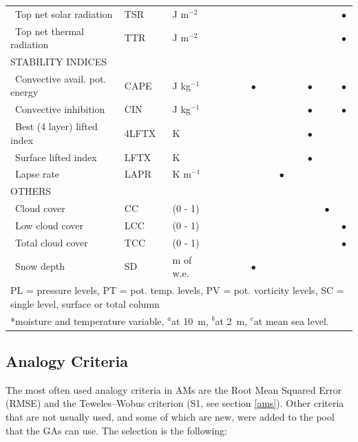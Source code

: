 \documentclass[draft]{agujournal2019}
\begin{document}
\begin{table}[!htbp]
{\begin{tabular}{lll|cccc|cccc|cc}
		\ Top net solar radiation & TSR & J m$^{-2}$ &  &  &  &  &  &  &  & & & $\bullet$ \\
		\ Top net thermal radiation & TTR & J m$^{-2}$ &  &  &  &  &  &  &  & & & $\bullet$ \\
		\hline
		\multicolumn{3}{l|}{\uppercase{Stability indices}} & & & & & & & & & & \\
		\ Convective avail. pot. energy & CAPE & J kg$^{-1}$ &  &  &  & $\bullet$ &  &  &  & $\bullet$ & & $\bullet$ \\
		\ Convective inhibition & CIN & J kg$^{-1}$ &  &  &  &  &  &  &  & $\bullet$ & & $\bullet$ \\
		\ Best (4 layer) lifted index & 4LFTX & K &  &  &  &  &  &  &  & $\bullet$ & & \\
		\ Surface lifted index & LFTX & K &  &  &  &  &  &  &  & $\bullet$ & & \\
		\ Lapse rate & LAPR & K m$^{-1}$ &  &  &  &  &  & $\bullet$ &  &  & & \\
		\hline
		\multicolumn{3}{l|}{\uppercase{Others}} & & & & & & & & & & \\
		\ Cloud cover & CC & (0 - 1) &  &  &  &  &  &  &  &  & $\bullet$ & \\
		\ Low cloud cover & LCC & (0 - 1) &  &  &  &  &  &  &  &  & & $\bullet$ \\
		\ Total cloud cover & TCC & (0 - 1) &  &  &  &  &  &  &  &  &  & $\bullet$ \\
		\ Snow depth & SD & m of w.e. &  &  &  & $\bullet$ &  &  &  &  & & \\
		\hline
		\multicolumn{13}{l}{PL = pressure levels, PT = pot. temp. levels, PV = pot. vorticity levels, SC = single level, surface or total column} \\
		\multicolumn{13}{l}{*moisture and temperature variable, $^{a}$at 10~m, $^{b}$at 2~m, $^{c}$at mean sea level.}\\
		\hline 
	\end{tabular}}
	\label{list_variables}
\end{table}


\subsection{Analogy Criteria}
\label{criteria}

The most often used analogy criteria in AMs are the Root Mean Squared Error (RMSE) and the Teweles--Wobus criterion (S1, see section \ref{ams}). Other criteria that are not usually used, and some of which are new, were added to the pool that the GAs can use. The selection is the following:
\end{document}
